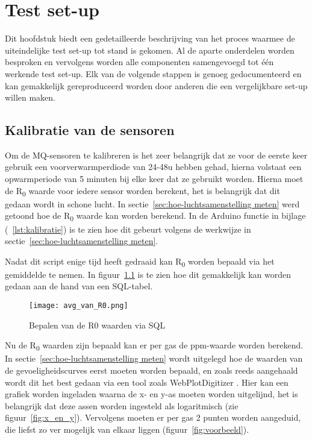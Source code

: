
\chapter{Test set-up}%
\label{ch:test_setup}

Dit hoofdstuk biedt een gedetailleerde beschrijving van het proces waarmee de uiteindelijke test set-up tot stand is gekomen. Al de aparte onderdelen worden besproken en vervolgens worden alle componenten samengevoegd tot één werkende test set-up. Elk van de volgende stappen is genoeg gedocumenteerd en kan gemakkelijk gereproduceerd worden door anderen die een vergelijkbare set-up willen maken.

\section{Kalibratie van de sensoren}%
\label{sec:kalibratie}

Om de MQ-sensoren te kalibreren is het zeer belangrijk dat ze voor de eerste keer gebruik een voorverwarmperdiode van 24-48u hebben gehad, hierna volstaat een opwarmperiode van 5 minuten bij elke keer dat ze gebruikt worden. Hierna moet de R\textsubscript{0} waarde voor iedere sensor worden berekent, het is belangrijk dat dit gedaan wordt in schone lucht. In sectie~\ref{sec:hoe-luchtsamenstelling meten} werd getoond hoe de R\textsubscript{0} waarde kan worden berekend. In de Arduino functie in bijlage (~\ref{lst:kalibratie}) is te zien hoe dit gebeurt volgens de werkwijze in sectie~\ref{sec:hoe-luchtsamenstelling meten}.

Nadat dit script enige tijd heeft gedraaid kan R\textsubscript{0} worden bepaald via het gemiddelde te nemen. In figuur~\ref{fig:avg_van_R0} is te zien hoe dit gemakkelijk kan worden gedaan aan de hand van een SQL-tabel.

\begin{figure}[h]
    \texttt{[image: avg\_van\_R0.png]}
    \caption[R0 waarden in SQL]{Bepalen van de R0 waarden via SQL}
    \label{fig:avg_van_R0}
\end{figure}

Nu de R\textsubscript{0} waarden zijn bepaald kan er per gas de ppm-waarde worden berekend. In sectie~\ref{sec:hoe-luchtsamenstelling meten} wordt uitgelegd hoe de waarden van de gevoeligheidscurves eerst moeten worden bepaald, en zoals reeds aangehaald wordt dit het best gedaan via een tool zoals WebPlotDigitizer
. Hier kan een grafiek worden ingeladen waarna de x- en y-as moeten worden uitgelijnd, het is belangrijk dat deze assen worden ingesteld als logaritmisch (zie figuur~\ref{fig:x_en_y}). Vervolgens moeten er per gas 2 punten worden aangeduid, die liefst zo ver mogelijk van elkaar liggen (figuur~\ref{fig:voorbeeld}).

